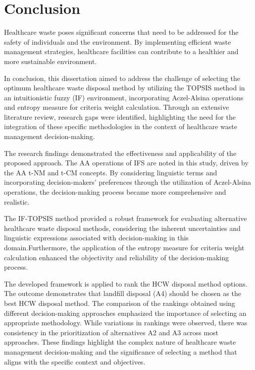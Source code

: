 \chapter{Conclusion}
\begin{flushleft}

Healthcare waste poses significant concerns that need to be addressed for the safety of individuals and the environment. By implementing efficient waste management strategies, healthcare facilities can contribute to a healthier and more sustainable environment.

\vspace{3mm}

In conclusion, this dissertation aimed to address the challenge of selecting the optimum healthcare waste disposal method by utilizing the TOPSIS method in an intuitionistic fuzzy (IF) environment, incorporating Aczel-Alsina operations and entropy measure for criteria weight calculation. Through an extensive literature review, research gaps were identified, highlighting the need for the integration of these specific methodologies in the context of healthcare waste management decision-making.

\vspace{3mm}

The research findings demonstrated the effectiveness and applicability of the proposed approach. The AA operations of IFS are noted in this
study, driven by the AA t-NM and t-CM concepts. By considering linguistic terms and incorporating decision-makers' preferences through the utilization of Aczel-Alsina operations, the decision-making process became more comprehensive and realistic.

\vspace{3mm}

The IF-TOPSIS method provided a robust framework for evaluating alternative healthcare waste disposal methods, considering the inherent uncertainties and linguistic expressions associated with decision-making in this domain.Furthermore, the application of the entropy measure for criteria weight calculation enhanced the objectivity and reliability of the decision-making process.

\vspace{3mm}

The developed framework is applied to rank the HCW disposal method options. The outcome demonstrates that 
landfill disposal (A4) should be chosen as the best HCW disposal method. 
The comparison of the rankings obtained using different decision-making approaches emphasized the importance of selecting an appropriate methodology. While variations in rankings were observed, there was consistency in the prioritization of alternatives A2 and A3 across most approaches. These findings highlight the complex nature of healthcare waste management decision-making and the significance of selecting a method that aligns with the specific context and objectives.


\end{flushleft}
